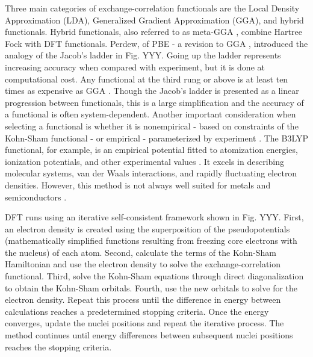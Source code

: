 \documentclass[3p,review,12pt]{elsarticle}
\begin{document}
Three main categories of exchange-correlation functionals are the Local Density Approximation (LDA), Generalized Gradient Approximation (GGA), and hybrid functionals. Hybrid functionals, also referred to as meta-GGA , combine Hartree Fock with DFT functionals. Perdew, of PBE - a revision to GGA \cite{Perdew1996}, introduced the analogy of the Jacob's ladder in Fig. YYY. Going up the ladder represents increasing accuracy when compared with experiment, but it is done at computational cost. Any functional at the third rung or above is at least ten times as expensive as GGA \cite{Lee2012}. Though the Jacob's ladder is presented as a linear progression between functionals, this is a large simplification and the accuracy of a functional is often system-dependent. Another important consideration when selecting a functional is whether it is nonempirical - based on constraints of the Kohn-Sham functional - or empirical - parameterized by experiment \cite{Sholl2009}. The B3LYP functional, for example, is an empirical potential fitted to atomization energies, ionization potentials, and other experimental values \cite{Lee2012}. It excels in describing molecular systems, van der Waals interactions, and rapidly fluctuating electron densities. However, this method is not always well suited for metals and semiconductors \cite{Paier2007}.
\par 

DFT runs using an iterative self-consistent framework shown in Fig. YYY. First, an electron density is created using the superposition of the pseudopotentials (mathematically simplified functions resulting from freezing core electrons with the nucleus) of each atom. Second, calculate the terms of the Kohn-Sham Hamiltonian and use the electron density to solve the exchange-correlation functional.  Third, solve the Kohn-Sham equations through direct diagonalization to obtain the Kohn-Sham orbitals. Fourth, use the new orbitals to solve for the electron density. Repeat this process until the difference in energy between calculations reaches a predetermined stopping criteria. Once the energy converges, update the nuclei positions and repeat the iterative process. The method continues until energy differences between subsequent nuclei positions reaches the stopping criteria. 
\end{document}
